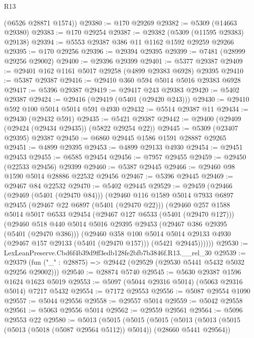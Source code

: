 \begin{lexlean}{R13}
\begin{coremodule}
      (@6526 @28871 @1574))
@29380 := @170 @29269
@29382 := @5309 (@14663 @29380)
@29383 := @170 @29254
@29387 := @29382 (@5309 (@11595 @29383) @29138)
@29394 := @5553 @29387 @386 @11 @1162 @1592 @29259 @29266
@29395 := @170 @29256
@29396 := @29394 @29395
@29399 := @7481 (@28999 @29256 @29002)
@29400 := @29396 @29399
@29401 := @5377 @29387
@29409 := @29401 @162 @1161 @5017 @29258 (@4899 @29383 @6928) @29395
@29410 := @5387 @29387
@29416 := @29410 @360 @594 @5014 @5016 @29383 @6928
@29417 := @5396 @29387
@29419 := @29417 @243 @29383
@29420 := @5402 @29387
@29424 := @29416 (@29419 (@5401 (@29420 @243)))
@29430 := @29410 @592 @100 @5014 @5014 @591 @4930
@29432 := @5514 @29387 @11
@29434 := @29430 (@29432 @591)
@29435 := @5421 @29387
@29442 := @29400 (@29409 (@29424 (@29434 @29435)) (@5822 @29254 @22))
@29445 := @5309 (@23407 @29395) @29387
@29450 := @6860 @29445 @1586 @1591 @28887 @29265
@29451 := @4899 @29395
@29453 := @4899 @29133 @4930
@29454 := @29451 @29453
@29455 := @6585 @29454
@29456 := @7957 @29455
@29459 := @29450 (@22533 @29456) @29399
@29460 := @5387 @29445
@29466 := @29460 @98 @1590 @5014 @28886 @22532 @29456
@29467 := @5396 @29445
@29469 := @29467 @84 @22532
@29470 := @5402 @29445
@29529 := @29459
    (@29466
      (@29469 (@5401 (@29470 @84)))
      (@29460
        @116
        @1589
        @5014
        @7933
        @6897
        @29455
        (@29467 @22 @6897 (@5401 (@29470 @22)))
        (@29460
          @257
          @1588
          @5014
          @5017
          @6533
          @29454
          (@29467 @127 @6533 (@5401 (@29470 @127)))
          (@29460
            @518
            @440
            @5014
            @5016
            @29395
            @29453
            (@29467 @386 @29395 (@5401 (@29470 @386)))
            (@29460
              @358
              @100
              @5014
              @5014
              @29133
              @4930
              (@29467 @157 @29133 (@5401 (@29470 @157)))
              (@5421 @29445))))))
@29530 := LexLeanPreserve.Cbd6f4b39d9ff3edb128fe2bfb7b3846f.R13.__rel_30
@29539 := @29379 (fun ("_" : @28875) => @29442 (@29529 (@29530 @5441 @5432 @5032 @29256 @29002)))
@29540 := @28874 @5740
@29545 := @5630 @29387 @1596 @1624 @1623 @5019
@29553 := @5097 (@5044 @29316 @5014) (@5063 @29316 @5014) @7217 @5432
@29554 := @7172 @29553
@29556 := @5087 @29554 @1090
@29557 := @5044 @29556
@29558 := @29557 @5014
@29559 := @5042 @29558
@29561 := @5063 @29556 @5014
@29562 := @29559 @29561
@29564 := @5096 @29553 @22
@29580 := @5013
    (@5015
      (@5015
        (@5015
          (@5013
            (@5013 (@5015 (@5013 (@5018 (@5087 @29564 @5112)) @5014)) (@28660 @5441 @29564))

\end{coremodule}
\end{lexlean}
